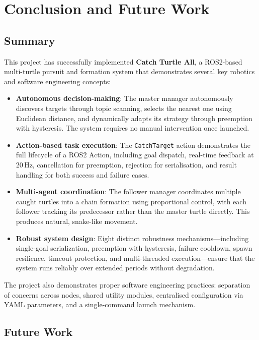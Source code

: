 \chapter{Conclusion and Future Work\label{chap:conclusion}}

\section{Summary}

This project has successfully implemented \textbf{Catch Turtle All}, a ROS2-based multi-turtle pursuit and formation system that demonstrates several key robotics and software engineering concepts:

\begin{itemize}
  \item \textbf{Autonomous decision-making}: The master manager autonomously discovers targets through topic scanning, selects the nearest one using Euclidean distance, and dynamically adapts its strategy through preemption with hysteresis. The system requires no manual intervention once launched.

  \item \textbf{Action-based task execution}: The \texttt{CatchTarget} action demonstrates the full lifecycle of a ROS2 Action, including goal dispatch, real-time feedback at 20\,Hz, cancellation for preemption, rejection for serialisation, and result handling for both success and failure cases.

  \item \textbf{Multi-agent coordination}: The follower manager coordinates multiple caught turtles into a chain formation using proportional control, with each follower tracking its predecessor rather than the master turtle directly. This produces natural, snake-like movement.

  \item \textbf{Robust system design}: Eight distinct robustness mechanisms---including single-goal serialization, preemption with hysteresis, failure cooldown, spawn resilience, timeout protection, and multi-threaded execution---ensure that the system runs reliably over extended periods without degradation.
\end{itemize}

The project also demonstrates proper software engineering practices: separation of concerns across nodes, shared utility modules, centralised configuration via YAML parameters, and a single-command launch mechanism.

\section{Future Work}

